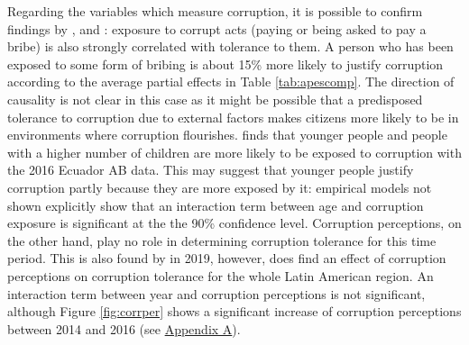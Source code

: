 \documentclass[floatsintext,man]{apa7}\usepackage[]{graphicx}\usepackage[]{color}
\begin{document}
Regarding the variables which measure corruption, it is possible to confirm findings by \textcite{Moscoso.2020}, \textcite{Lupu.2017} and \textcite{Singer.2016}: exposure to corrupt acts (paying or being asked to pay a bribe) is also strongly correlated with tolerance to them. A person who has been exposed to some form of bribing is about 15\% more likely to justify corruption according to the average partial effects in Table \ref{tab:apescomp}. The direction of causality is not clear in this case as it might be possible that a predisposed tolerance to corruption due to external factors makes citizens more likely to be in environments where corruption flourishes. \textcite{Moscoso.2018} finds that younger people and people with a higher number of children are more likely to be exposed to corruption with the 2016 Ecuador AB data. This may suggest that younger people justify corruption partly because they are more exposed by it: empirical models not shown explicitly show that an interaction term between age and corruption exposure is significant at the the 90\% confidence level. Corruption perceptions, on the other hand, play no role in determining corruption tolerance for this time period. This is also found by \textcite{Moscoso.2020} in 2019, however, \textcite{Lupu.2017} does find an effect of corruption perceptions on corruption tolerance for the whole Latin American region. An interaction term between year and corruption perceptions is not significant, although Figure \ref{fig:corrper} shows a significant increase of corruption perceptions between 2014 and 2016 (see \hyperref[app:first]{Appendix A}). 
\end{document}
